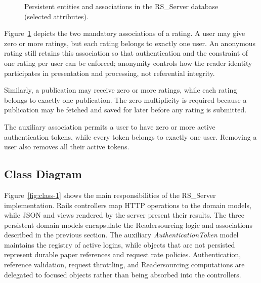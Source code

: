 \documentclass[a4paper, english]{article}
\newcommand{\rsserver}{RS\_Server\xspace}
\begin{document}
\begin{figure}[!tbp]
{%
}
\caption{Persistent entities and associations in the \rsserver database (selected attributes).}
\label{fig:er}
\end{figure}

Figure~\ref{fig:er} depicts the two mandatory associations of a rating. A user may give zero or more ratings, but each rating belongs to exactly one user. An anonymous rating still retains this association so that authentication and the constraint of one rating per user can be enforced; anonymity controls how the reader identity participates in presentation and processing, not referential integrity.

Similarly, a publication may receive zero or more ratings, while each rating belongs to exactly one publication. The zero multiplicity is required because a publication may be fetched and saved for later before any rating is submitted.

The auxiliary association permits a user to have zero or more active authentication tokens, while every token belongs to exactly one user. Removing a user also removes all their active tokens.

\subsection{Class Diagram}

Figure~\ref{fig:class-1} shows the main responsibilities of the \rsserver implementation. Rails controllers map HTTP operations to the domain models, while JSON and views rendered by the server present their results. The three persistent domain models encapsulate the Readersourcing logic and associations described in the previous section. The auxiliary \emph{AuthenticationToken} model maintains the registry of active logins, while objects that are not persisted represent durable paper references and request rate policies. Authentication, reference validation, request throttling, and Readersourcing computations are delegated to focused objects rather than being absorbed into the controllers.
\end{document}

